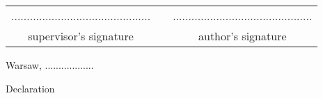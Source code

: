 \documentclass[a4paper,11pt,twoside,usenames,dvipsnames]{report}
\theoremstyle{definition}
\newcommand{\tytul}{Nowatorska metoda śledzenia w systemach chmurowych z elementami proweniencji}
\renewcommand{\title}{Novel method for provenance-enhanced tracing in cloud systems}
\begin{document}
\sloppy
{}




\thispagestyle{empty}\newpage
\null

\vfill

\begin{center}
\begin{tabular}[t]{ccc}
............................................. & \hspace*{100pt} & .............................................\\
supervisor's signature & \hspace*{100pt} & author's signature
\end{tabular}
\end{center}




{
\begin{abstract}

\begin{center}
\title
\end{center}



\end{abstract}
}

\null\thispagestyle{empty}\newpage


{
\begin{abstract}

\begin{center}
\tytul
\end{center}



\end{abstract}
}




\null\thispagestyle{empty}\newpage

\null \hfill Warsaw, ..................\\

\par\vspace{5cm}

\begin{center}
Declaration
\end{center}
\end{document}
